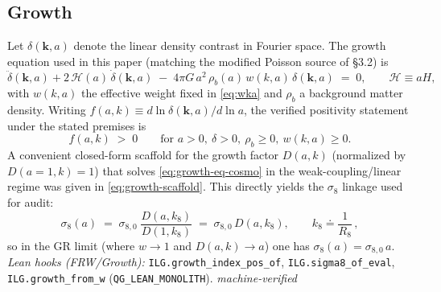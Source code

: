 \documentclass[12pt,a4paper]{article}
\begin{document}
\subsection{Growth}
Let \(\delta(\mathbf{k},a)\) denote the linear density contrast in Fourier space. The growth equation used in this paper (matching the modified Poisson source of §3.2) is
\begin{equation}
  \ddot{\delta}(\mathbf{k},a) + 2\,\mathcal{H}(a)\,\dot{\delta}(\mathbf{k},a)
  \;-\; 4\pi G\,a^2\,\rho_b(a)\,w(k,a)\,\delta(\mathbf{k},a)\;=\;0,
  \qquad \mathcal{H}\equiv aH,
  \label{eq:growth-eq-cosmo}
\end{equation}
with \(w(k,a)\) the effective weight fixed in \eqref{eq:wka} and \(\rho_b\) a background matter density. Writing \(f(a,k)\equiv d\ln\delta(\mathbf{k},a)/d\ln a\), the verified positivity statement under the stated premises is
\begin{equation}
  f(a,k) \;>\; 0 \qquad \text{for } a>0,\ \delta>0,\ \rho_b\ge 0,\ w(k,a)\ge 0.
  \label{eq:growth-index-positive}
\end{equation}
A convenient closed-form scaffold for the growth factor \(D(a,k)\) (normalized by \(D(a{=}1,k)=1\)) that solves \eqref{eq:growth-eq-cosmo} in the weak-coupling/linear regime was given in \eqref{eq:growth-scaffold}. This directly yields the \(\sigma_8\) linkage used for audit:
\begin{equation}
  \sigma_8(a)\;=\; \sigma_{8,0}\;\frac{D(a,k_8)}{D(1,k_8)} 
  \;=\; \sigma_{8,0}\,D(a,k_8),
  \qquad k_8 \doteq \frac{1}{R_8}\,,
  \label{eq:sigma8-link}
\end{equation}
so in the GR limit (where \(w\to 1\) and \(D(a,k)\to a\)) one has \(\sigma_8(a)=\sigma_{8,0}\,a\). 
\emph{Lean hooks (FRW/Growth):} \texttt{ILG.growth\_index\_pos\_of}, \texttt{ILG.sigma8\_of\_eval}, \texttt{ILG.growth\_from\_w} (\texttt{QG\_LEAN\_MONOLITH}). \emph{machine-verified}
\end{document}
